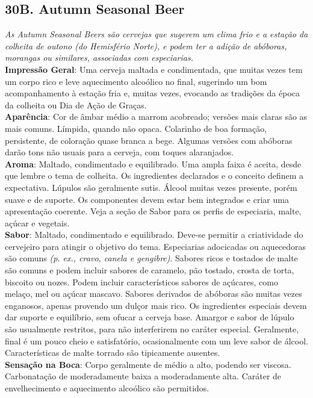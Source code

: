 \subsection*{30B. Autumn Seasonal Beer}
\textit{As Autumn Seasonal Beers são cervejas que sugerem um clima frio e a estação da colheita de outono (do Hemisfério Norte), e podem ter a adição de abóboras, morangas ou similares, associadas com especiarias.}\\
\textbf{Impressão Geral}: Uma cerveja maltada e condimentada, que muitas vezes tem um corpo rico e leve aquecimento alcoólico no final, sugerindo um bom acompanhamento à estação fria e, muitas vezes, evocando as tradições da época da colheita ou Dia de Ação de Graças. \\
\textbf{Aparência}: Cor de âmbar médio a marrom acobreado; versões mais claras são as mais comuns. Límpida, quando não opaca. Colarinho de boa formação, persistente, de coloração quase branca a bege. Algumas versões com abóboras darão tons não usuais para a cerveja, com toques alaranjados. \\
\textbf{Aroma}: Maltado, condimentado e equilibrado. Uma ampla faixa é aceita, desde que lembre o tema de colheita. Os ingredientes declarados e o conceito definem a expectativa. Lúpulos são geralmente sutis. Álcool muitas vezes presente, porém suave e de suporte. Os componentes devem estar bem integrados e criar uma apresentação coerente. Veja a seção de Sabor para os perfis de especiaria, malte, açúcar e vegetais. \\
\textbf{Sabor}: Maltado, condimentado e equilibrado. Deve-se permitir a criatividade do cervejeiro para atingir o objetivo do tema. Especiarias adocicadas ou aquecedoras são comuns \textit{(p. ex., cravo, canela e gengibre)}. Sabores ricos e tostados de malte são comuns e podem incluir sabores de caramelo, pão tostado, crosta de torta, biscoito ou nozes. Podem incluir característicos sabores de açúcares, como melaço, mel ou açúcar mascavo. Sabores derivados de abóboras são muitas vezes enganosos, apenas provendo um dulçor mais rico. Os ingredientes especiais devem dar suporte e equilíbrio, sem ofucar a cerveja base. Amargor e sabor de lúpulo são usualmente restritos, para não interferirem no caráter especial. Geralmente, final é um pouco cheio e satisfatório, ocasionalmente com um leve sabor de álcool. Características de malte torrado são tipicamente ausentes. \\
\textbf{Sensação na Boca}: Corpo geralmente de médio a alto, podendo ser viscosa. Carbonatação de moderadamente baixa a moderadamente alta. Caráter de envelhecimento e aquecimento alcoólico são permitidos. \\
